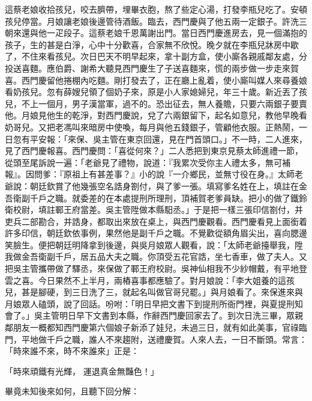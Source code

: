 這蔡老娘收拾孩兒，咬去臍帶，埋畢衣胞，熬了些定心湯，打發李瓶兒吃了。安頓孩兒停當。月娘讓老娘後邊管待酒飯。臨去，西門慶與了他五兩一定銀子。許洗三朝來還與他一疋段子。這蔡老娘千恩萬謝出門。當日西門慶進房去，見一個滿抱的孩子，生的甚是白淨，心中十分歡喜，合家無不欣悅。晚夕就在李瓶兒牀房中歇了，不住來看孩兒。次日巴天不明早起來，拿十副方盒，使小廝各親戚鄰友處，分投送喜麵。應伯爵、謝希大聽見西門慶生了子送喜麵來，慌的兩步做一步走來賀喜。西門慶留他捲棚內吃麵。剛打發去了，正在廳上亂着，使小廝叫媒人來尋養娘看奶孩兒。忽有薛嫂兒領了個奶子來，原是小人家媳婦兒，年三十歲。新近丟了孩兒，不上一個月，男子漢當軍，過不的。恐出征去，無人養贍，只要六兩銀子要賣他。月娘見他生的乾淨，對西門慶說，兌了六兩銀留下，起名如意兒，教他早晚看奶哥兒。又把老馮叫來暗房中使喚，每月與他五錢銀子，管顧他衣服。正熱鬧，一日忽有平安報：「來保、吳主管在東京回還，見在門首頭口。」不一時，二人進來，見了西門慶報喜。西門慶問：「喜從何來？」二人悉把到東京見蔡太師進禮一節，從頭至尾訴說一遍：「老爺見了禮物，說道：『我累次受你主人禮太多，無可補報』。因問爹：『原祖上有甚差事？』小的說『一介鄉民，並無寸役在身。』太師老爺說：朝廷欽賞了他幾張空名誥身劄付，與了爹一張。填寫爹名姓在上，填註在金吾衛副千戶之職。就委差的在本處提刑所理刑，頂補賀老爹員缺。把小的做了鐵鈴衛校尉，填註鄆王府當差。吳主管陞做本縣馹丞。」于是把一樣三張印信劄付，并吏兵二部勘合，并誥身，都取出來放在桌上，與西門慶觀看。西門慶看見上面銜着許多印信，朝廷欽依事例，果然他是副千戶之職。不覺歡從額角眉尖出，喜向腮邊笑臉生。便把朝廷明降拿到後邊，與吳月娘眾人觀看，說：「太師老爺擡舉我，陞我做金吾衛副千戶，居五品大夫之職。你頂受五花官誥，坐七香車，做了夫人。又把吳主管攜帶做了驛丞，來保做了鄆王府校尉。吳神仙相我不少紗帽戴，有平地登雲之喜。今日果然不上半月，兩樁喜事都應驗了。對月娘說：「李大姐養的這孩兒，甚是腳硬，到三日洗了三，就起名叫做官哥兒罷。」與月娘看了。來保進來與月娘眾人磕頭，說了回話。吩咐：「明日早把文書下到提刑所衙門裡，與夏提刑知會了。」吳主管明日早下文書到本縣，作辭西門慶回家去了。到次日洗三畢，眾親鄰朋友一概都知西門慶第六個娘子新添了娃兒，未過三日，就有如此美事，官祿臨門，平地做千戶之職，誰人不來趨附，送禮慶賀。人來人去，一日不斷頭。常言：「時來誰不來，時不來誰來」正是：

「時來頑鐵有光輝，  運退真金無豔色！」

畢竟未知後來如何，且聽下回分解：


